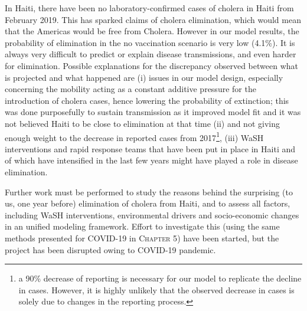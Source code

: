  In Haiti, there have been no laboratory-confirmed cases of cholera in Haiti from February 2019. This has sparked claims of cholera elimination, which would mean that the Americas would be free from Cholera. However in our model results, the probability of elimination in the no vaccination scenario is very low (4.1\%). It is always very difficult to predict or explain disease transmissions, and even harder for elimination. Possible explanations for the discrepancy observed between what is projected and what happened are (i) issues in our model design, especially concerning the mobility acting as a constant additive pressure for the introduction of cholera cases, hence lowering the probability of extinction; this was done purposefully to sustain transmission as it improved model fit and it was not believed Haiti to be close to elimination at that time (ii) and not giving enough weight to the decrease in reported cases from 2017\footnote[][-1.5\baselineskip]{a 90\% decrease of reporting is necessary for our model to replicate the decline in cases. However, it is highly unlikely that the observed decrease in cases is solely due to changes in the reporting process.}, (iii) WaSH interventions and rapid response teams that have been put in place in Haiti and of which have intensified in the last few years\cite{Rebaudet:CaseareaTargetedRapid:2019} might have played a role in disease elimination.
  
 Further work must be performed to study the reasons behind the surprising (to us, one year before) elimination of cholera from Haiti, and to assess all factors, including WaSH interventions, environmental drivers and socio-economic changes in an unified modeling framework. Effort to investigate this (using the same methods presented for COVID-19 in \textsc{Chapter 5}) have been started, but the project has been disrupted owing to COVID-19 pandemic.
 
